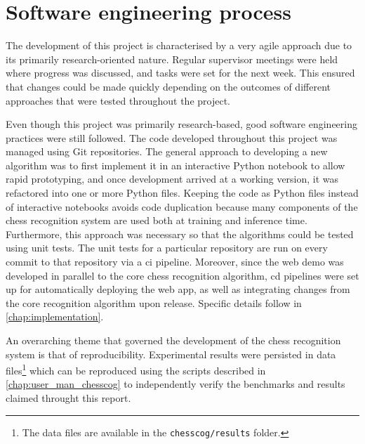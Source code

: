 \section{Software engineering process}
The development of this project is characterised by a very agile approach due to its primarily research-oriented nature.
Regular supervisor meetings were held where progress was discussed, and tasks were set for the next week.
This ensured that changes could be made quickly depending on the outcomes of different approaches that were tested throughout the project.

Even though this project was primarily research-based, good software engineering practices were still followed.
The code developed throughout this project was managed using Git repositories.
The general approach to developing a new algorithm was to first implement it in an interactive Python notebook to allow rapid prototyping, and once development arrived at a working version, it was refactored into one or more Python files.
Keeping the code as Python files instead of interactive notebooks avoids code duplication because many components of the chess recognition system are used both at training and inference time.
Furthermore, this approach was necessary so that the algorithms could be tested using unit tests.
The unit tests for a particular repository are run on every commit to that repository via a \gls{ci} pipeline.
Moreover, since the web demo was developed in parallel to the core chess recognition algorithm, \gls{cd} pipelines were set up for automatically deploying the web app, as well as integrating changes from the core recognition algorithm upon release.
Specific details follow in \cref{chap:implementation}.

An overarching theme that governed the development of the chess recognition system is that of reproducibility.
Experimental results were persisted in data files\footnote{The data files are available in the \texttt{chesscog/results} folder.} which can be reproduced using the scripts described in \cref{chap:user_man_chesscog} to independently verify the benchmarks and results claimed throught this report.